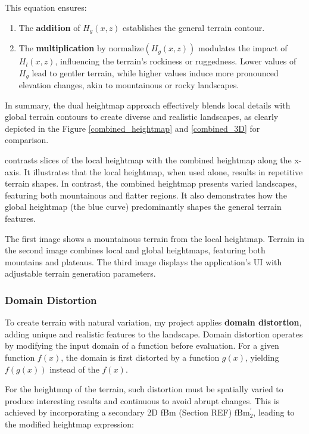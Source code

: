 This equation ensures:

\begin{enumerate}
    \item The \textbf{addition} of $H_{g}(x,z)$ establishes the general terrain contour.
    \item The \textbf{multiplication} by $\text{normalize}(H_{g}(x,z))$ modulates the impact of $H_{l}(x,z)$, influencing the terrain's rockiness or ruggedness. Lower values of $H_{g}$ lead to gentler terrain, while higher values induce more pronounced elevation changes, akin to mountainous or rocky landscapes.
\end{enumerate}

In summary, the dual heightmap approach effectively blends local details with global terrain contours to create diverse and realistic landscapes, as clearly depicted in the Figure \ref{combined_heightmap} and \ref{combined_3D} for comparison.

{contrasts slices of the local heightmap with the combined heightmap along the x-axis. It illustrates that the local heightmap, when used alone, results in repetitive terrain shapes. In contrast, the combined heightmap presents varied landscapes, featuring both mountainous and flatter regions. It also demonstrates how the global heightmap (the blue curve) predominantly shapes the general terrain features.}

{The first image shows a mountainous terrain from the local heightmap. Terrain in the second image combines local and global heightmaps, featuring both mountains and plateaus. The third image displays the application's UI with adjustable terrain generation parameters.}


\subsubsection{Domain Distortion}

To create terrain with natural variation, my project applies \textbf{domain distortion}, adding unique and realistic features to the landscape. Domain distortion operates by modifying the input domain of a function before evaluation. For a given function $f(x)$, the domain is first distorted by a function $g(x)$, yielding $f(g(x))$ instead of the $f(x)$.

For the heightmap of the terrain, such distortion must be spatially varied to produce interesting results and continuous to avoid abrupt changes. This is achieved by incorporating a secondary 2D fBm (Section REF) $\text{fBm}^\prime_2$, leading to the modified heightmap expression:

